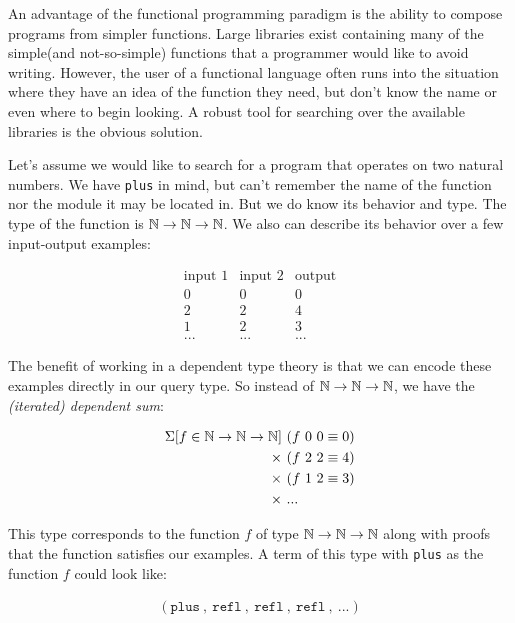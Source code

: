 \documentclass[acmsmall,review,authorversion]{acmart}
\newcommand{\?}{\stackrel{?}{\approx}}
\newcommand{\N}{\mathbb{N}}
\newcommand{\ra}{\rightarrow}
\begin{document}
\newcommand{\extype}{\ensuremath \N \ra \N \ra \N}

An advantage of the functional programming paradigm is the ability to compose
programs from simpler functions. Large libraries exist containing many of the
simple(and not-so-simple) functions that a programmer would like to avoid
writing. However, the user of a functional language often runs into the
situation where they have an idea of the function they need, but don't know the
name or even where to begin looking. A robust tool for searching over the
available libraries is the obvious solution.

Let's assume we would like to search for a program that operates on two natural
numbers. We have \texttt{plus} in mind, but can't remember the name of the
function nor the module it may be located in. But we do know its behavior and
type. The type of the function is $\extype$. We also can describe its behavior
over a few input-output examples:

$$
\begin{array}{ccc}
  \text{input 1} & \text{input 2} & \text{output}\\
  0 & 0 & 0\\
  2 & 2 & 4\\
  1 & 2 & 3\\
  ... &...&...
\end{array}
$$

The benefit of working in a dependent type theory is that we can encode these
examples directly in our query type. So instead of $\extype$, we have the
\textit{(iterated) dependent sum}:


\begin{align*}
\Sigma[ f \in \extype]\ &(f\ 0\ 0 \equiv 0)\\
                         \times\ &(f\ 2\ 2 \equiv 4)\\
                         \times\ &(f\ 1\ 2 \equiv 3)\\
                         \times\ &...
\end{align*}

This type corresponds to the function $f$ of type $\extype$ along with proofs
that the function satisfies our examples. A term of this type with \texttt{plus}
as the function $f$ could look like:

\begin{align*}
  ( \texttt{plus}\ ,\ \texttt{refl}\ ,\ \texttt{refl}\ ,\ \texttt{refl}\ ,\ ...)
\end{align*}
\end{document}
